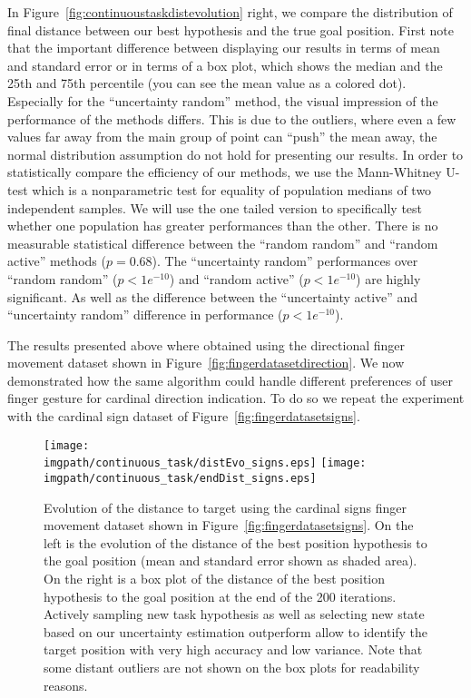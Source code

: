 In Figure~\ref{fig:continuoustaskdistevolution} right, we compare the distribution of final distance between our best hypothesis and the true goal position. First note that the important difference between displaying our results in terms of mean and standard error or in terms of a box plot, which shows the median and the 25th and 75th percentile (you can see the mean value as a colored dot). Especially for the ``uncertainty random'' method, the visual impression of the performance of the methods differs. This is due to the outliers, where even a few values far away from the main group of point can ``push'' the mean away, the normal distribution assumption do not hold for presenting our results. In order to statistically compare the efficiency of our methods, we use the Mann-Whitney U-test \cite{mann1947test} which is a nonparametric test for equality of population medians of two independent samples. We will use the one tailed version to specifically test whether one population has greater performances than the other. There is no measurable statistical difference between the ``random random'' and ``random active'' methods ($p = 0.68$). The ``uncertainty random'' performances over ``random random'' ($p<1e^{-10}$) and ``random active'' ($p<1e^{-10}$) are highly significant. As well as the difference between the ``uncertainty active'' and ``uncertainty random'' difference in performance ($p<1e^{-10}$).

The results presented above where obtained using the directional finger movement dataset shown in Figure~\ref{fig:fingerdatasetdirection}. We now demonstrated how the same algorithm could handle different preferences of user finger gesture for cardinal direction indication. To do so we repeat the experiment with the cardinal sign dataset of Figure~\ref{fig:fingerdatasetsigns}.

\begin{figure}[!ht]
\centering
\texttt{[image: \\imgpath/continuous\_task/distEvo\_signs.eps]}
\texttt{[image: \\imgpath/continuous\_task/endDist\_signs.eps]}
\caption{Evolution of the distance to target using the cardinal signs finger movement dataset shown in Figure~\ref{fig:fingerdatasetsigns}. On the left is the evolution of the distance of the best position hypothesis to the goal position (mean and standard error shown as shaded area). On the right is a box plot of the distance of the best position hypothesis to the goal position at the end of the 200 iterations. Actively sampling new task hypothesis as well as selecting new state based on our uncertainty estimation outperform allow to identify the target position with very high accuracy and low variance. Note that some distant outliers are not shown on the box plots for readability reasons.}
\label{fig:continuoustaskdistevolution_signs}
\end{figure}

